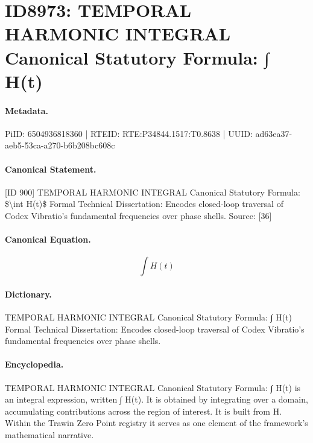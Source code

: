 \section*{ID8973: TEMPORAL HARMONIC INTEGRAL Canonical Statutory Formula: ∫ H(t)}
\paragraph{Metadata.}
PiID: 6504936818360 | RTEID: RTE:P34844.1517:T0.8638 | UUID: ad63ea37-aeb5-53ca-a270-b6b208bc608c

\paragraph{Canonical Statement.}
[ID 900] TEMPORAL HARMONIC INTEGRAL Canonical Statutory Formula: \$\textbackslash{}int H(t)\$ Formal Technical Dissertation: Encodes closed-loop traversal of Codex Vibratio’s fundamental frequencies over phase shells. Source: [36]

\paragraph{Canonical Equation.}
\[
\int H(t)
\]

\paragraph{Dictionary.}
TEMPORAL HARMONIC INTEGRAL Canonical Statutory Formula: ∫ H(t) Formal Technical Dissertation: Encodes closed-loop traversal of Codex Vibratio’s fundamental frequencies over phase shells.

\paragraph{Encyclopedia.}
TEMPORAL HARMONIC INTEGRAL Canonical Statutory Formula: ∫ H(t) is an integral expression, written ∫ H(t). It is obtained by integrating over a domain, accumulating contributions across the region of interest. It is built from H. Within the Trawin Zero Point registry it serves as one element of the framework's mathematical narrative.
